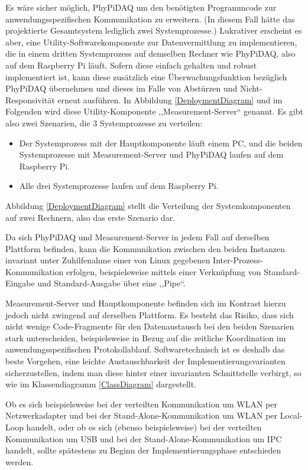 \documentclass[parskip=full]{scrartcl}
\begin{document}
Es wäre sicher möglich, PhyPiDAQ um den benötigten Programmcode zur anwendungsspezifischen Kommunikation zu erweitern. (In diesem Fall hätte das projektierte Gesamtsystem lediglich zwei Systemprozesse.) Lukrativer erscheint es aber, eine Utility-Softwarekomponente zur Datenvermittlung zu implementieren, die in einem dritten Systemprozess auf demselben Rechner wie PhyPiDAQ, also auf dem Raspberry Pi läuft. Sofern diese einfach gehalten und robust implementiert ist, kann diese zusätzlich eine Überwachungsfunktion bezüglich PhyPiDAQ übernehmen und dieses im Falle von Abstürzen und Nicht-Responsivität erneut ausführen. In Abbildung \ref{DeploymentDiagram} und im Folgenden wird diese Utility-Komponente ,,Measurement-Server`` genannt.
\newpage
Es gibt also zwei Szenarien, die 3 Systemprozesse zu verteilen: 

\begin{itemize}
	\item Der Systemprozess mit der Hauptkomponente läuft einem PC, und die beiden Systemprozesse mit Measurement-Server und PhyPiDAQ laufen auf dem Raspberry Pi. 
	\item Alle drei Systemprozesse laufen auf dem Raspberry Pi.
\end{itemize}

Abbildung \ref{DeploymentDiagram} stellt die Verteilung der Systemkomponenten auf zwei Rechnern, also das erste Szenario dar.

Da sich PhyPiDAQ und Measurement-Server in jedem Fall auf derselben Plattform befinden, kann die Kommunikation zwischen den beiden Instanzen invariant unter Zuhilfenahme einer von Linux gegebenen  Inter-Prozess-Kommunikation erfolgen, beispielsweise mittels einer Verknüpfung von Standard-Eingabe und Standard-Ausgabe über eine ,,Pipe``.

Measurement-Server und Hauptkomponente befinden sich im Kontrast hierzu jedoch nicht zwingend auf derselben Plattform. Es besteht das Risiko, dass sich nicht wenige Code-Fragmente für den Datenaustausch bei den beiden Szenarien stark unterscheiden, beispielsweise in Bezug auf die zeitliche Koordination im anwendungsspezifischen Protokollablauf. Softwaretechnisch ist es deshalb das beste Vorgehen, eine leichte Austauschbarkeit der Implementierungsvarianten sicherzustellen, indem man diese hinter einer invarianten Schnittstelle verbirgt, so wie im Klassendiagramm \ref{ClassDiagram} dargestellt.

Ob es sich beispielsweise bei der verteilten Kommunikation um WLAN per Netzwerkadapter und bei der \gls{Stand-Alone-Kommunikation} um WLAN per \gls{Local-Loop} handelt, oder ob es sich (ebenso beispielsweise) bei der verteilten Kommunikation um USB und bei der Stand-Alone-Kommunikation um IPC handelt, sollte spätestens zu Beginn der Implementierungsphase entschieden werden.  
\end{document}

